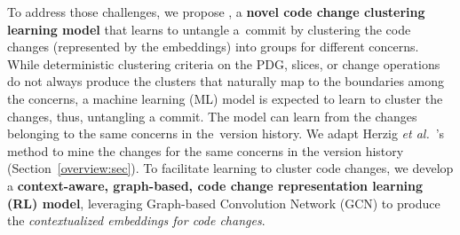 



To address those challenges, we propose {\tool}, a {\bf novel code
  change clustering learning model} that learns to untangle a~commit
by clustering the code changes (represented by the embeddings) into
groups for different concerns.
%
While deterministic clustering criteria on the PDG, slices, or change
operations do not always produce the clusters that naturally map to
the boundaries among the concerns, a machine learning (ML) model is
expected to learn to cluster the changes, thus, untangling a
commit. The model can learn from the changes belonging to the same
concerns in the~version history. We adapt Herzig {\em et
  al.}~\cite{kim-emse16}'s method to mine the changes for the same
concerns in the version history (Section~\ref{overview:sec}).
%
To facilitate learning to cluster code changes, we develop a {\bf
  context-aware, graph-based, code change representation learning (RL)
  model}, leveraging Graph-based Convolution Network (GCN) to produce
the {\em contextualized embeddings for code changes}.

